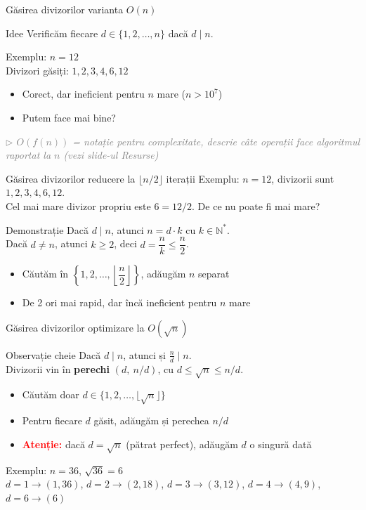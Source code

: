 \documentclass{beamer}
\newcommand{\beginnote}[1]{%
  \vfill
  {\footnotesize\textcolor{gray}{\textit{$\triangleright$ #1 (vezi slide-ul \emph{Resurse})}}}%
}
\begin{document}
\begin{frame}{Găsirea divizorilor \textemdash{} varianta $O(n)$}
  \begin{block}{Idee}
    Verificăm fiecare $d \in \{1, 2, \ldots, n\}$ dacă $d \mid n$.
  \end{block}
  \bigskip
  Exemplu: $n = 12$ \\
  Divizori găsiți: $1, 2, 3, 4, 6, 12$
  \bigskip
  \begin{itemize}
    \item Corect, dar ineficient pentru $n$ mare ($n > 10^7$)
    \item Putem face mai bine?
  \end{itemize}
  \beginnote{$O(f(n))$ = notație pentru complexitate, descrie câte operații face algoritmul raportat la $n$}
\end{frame}

\begin{frame}{Găsirea divizorilor \textemdash{} reducere la $\lfloor n/2 \rfloor$ iterații}
  Exemplu: $n = 12$, divizorii sunt $1, 2, 3, 4, 6, 12$. \\
  Cel mai mare divizor propriu este $6 = 12/2$. De ce nu poate fi mai mare?
  \bigskip
  \begin{block}{Demonstrație}
    Dacă $d \mid n$, atunci $n = d \cdot k$ cu $k \in \mathbb{N}^*$. \\
    Dacă $d \neq n$, atunci $k \geq 2$, deci $d = \dfrac{n}{k} \leq \dfrac{n}{2}$.
  \end{block}
  \bigskip
  \begin{itemize}
    \item Căutăm în $\left\{1, 2, \ldots, \left\lfloor\dfrac{n}{2}\right\rfloor\right\}$, adăugăm $n$ separat
    \item De 2 ori mai rapid, dar încă ineficient pentru $n$ mare
  \end{itemize}
\end{frame}

\begin{frame}{Găsirea divizorilor \textemdash{} optimizare la $O(\sqrt{n})$}
  \begin{block}{Observație cheie}
    Dacă $d \mid n$, atunci și $\frac{n}{d} \mid n$. \\
    Divizorii vin în \textbf{perechi} $(d,\ n/d)$, cu $d \leq \sqrt{n} \leq n/d$.
  \end{block}
  \bigskip
  \begin{itemize}
    \item Căutăm doar $d \in \{1, 2, \ldots, \lfloor\sqrt{n}\rfloor\}$
    \item Pentru fiecare $d$ găsit, adăugăm și perechea $n/d$
    \item  \textbf{\textcolor{red}{Atenție:}} dacă $d = \sqrt{n}$ (pătrat perfect), adăugăm $d$ o singură dată
  \end{itemize}
  \bigskip
  Exemplu: $n = 36$, $\sqrt{36} = 6$ \\
  $d=1\to(1,36)$, $d=2\to(2,18)$, $d=3\to(3,12)$, $d=4\to(4,9)$, $d=6\to(6)$
\end{frame}
\end{document}
